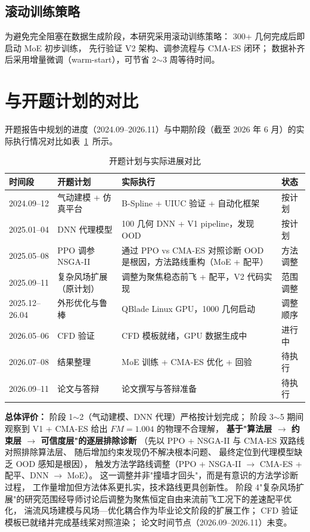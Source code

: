 \subsection{滚动训练策略}

为避免完全阻塞在数据生成阶段，本研究采用滚动训练策略：
300+ 几何完成后即启动 MoE 初步训练，
先行验证 V2 架构、调参流程与 CMA-ES 闭环；
数据补齐后采用增量微调（warm-start），可节省 2$\sim$3 周等待时间。

\section{与开题计划的对比}

开题报告中规划的进度（2024.09--2026.11）与中期阶段（截至 2026 年 6 月）的实际执行情况对比如表~\ref{tab:progress}~所示。

\begin{table}[htbp]
\centering
\caption{开题计划与实际进展对比}
\label{tab:progress}
\begin{tabular}{lp{3.5cm}p{4cm}l}
\toprule
\textbf{时间段} & \textbf{开题计划} & \textbf{实际执行} & \textbf{状态} \\
\midrule
2024.09--12 & 气动建模 + 仿真平台 & B-Spline + UIUC 验证 + 自动化框架 & 按计划 \\
2025.01--04 & DNN 代理模型 & 100 几何 DNN + V1 pipeline，发现 OOD & 按计划 \\
2025.05--08 & PPO 调参 NSGA-II & 通过 PPO vs CMA-ES 对照诊断 OOD 是根因，方法路线重构（MoE + 配平） & 方法调整 \\
2025.09--11 & 复杂风场扩展（原计划） & 调整为聚焦稳态前飞 + 配平，V2 代码实现 & 范围调整 \\
2025.12--26.04 & 外形优化与鲁棒 & QBlade Linux GPU，1000 几何启动 & 调整顺序 \\
2026.05--06 & CFD 验证 & CFD 模板就绪，GPU 数据生成中 & 进行中 \\
2026.07--08 & 结果整理 & MoE 训练 + CMA-ES 优化 + 回验 & 待执行 \\
2026.09--11 & 论文与答辩 & 论文撰写与答辩准备 & 待执行 \\
\bottomrule
\end{tabular}
\end{table}

\textbf{总体评价：}
阶段 1$\sim$2（气动建模、DNN 代理）严格按计划完成；
阶段 3$\sim$5 期间观察到 V1 + CMA-ES 给出 $FM=1.004$ 的物理不合理解，
\textbf{基于"算法层 $\to$ 约束层 $\to$ 可信度层"的逐层排除诊断}
（先以 PPO + NSGA-II 与 CMA-ES 双路线对照排除算法层、
随后增加约束发现仍不解决根本问题、
最终定位到代理模型缺乏 OOD 感知是根因），
触发方法学路线调整（PPO + NSGA-II $\to$ CMA-ES + 配平、DNN $\to$ MoE）。
这一调整并非"撞墙才回头"，而是有意识的方法学诊断过程，
工作量增加但方法体系更扎实，技术路线更具创新性。
阶段 4"复杂风场扩展"的研究范围经导师讨论后调整为聚焦恒定自由来流前飞工况下的差速配平优化，
湍流风场建模与风场—优化耦合作为毕业论文阶段的扩展工作；
CFD 验证模板已就绪并完成基线桨对照渲染；
论文时间节点（2026.09--2026.11）未变。

